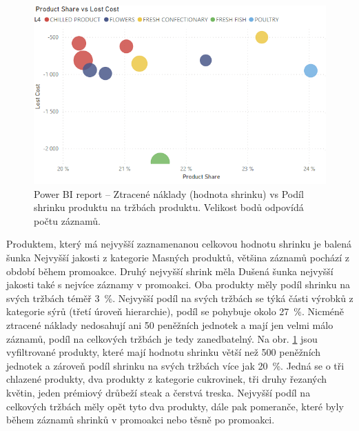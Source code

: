 \begin{figure}[h!]
    \centering
    \captionsetup{justification=centering}
    \includegraphics[width=.8\textwidth]{obrazky/PBI/l3pprductshare.png}
    \caption{Power BI report -- Ztracené náklady (hodnota shrinku) vs Podíl shrinku produktu na tržbách produktu. Velikost bodů odpovídá počtu záznamů.}
    \label{obr:PBI:l3prod}
\end{figure}

Produktem, který má nejvyšší zaznamenanou celkovou hodnotu shrinku je balená šunka Nejvyšší jakosti z kategorie Masných produktů, většina záznamů pochází z období během promoakce. Druhý nejvyšší shrink měla Dušená šunka nejvyšší jakosti také s nejvíce záznamy v promoakci. Oba produkty měly podíl shrinku na svých tržbách téměř 3~\%.  
Nejvyšší podíl na svých tržbách se týká části výrobků z kategorie sýrů (třetí úroveň hierarchie), podíl se pohybuje okolo 27~\%. Nicméně ztracené náklady nedosahují ani 50 peněžních jednotek a mají jen velmi málo záznamů, podíl na celkových tržbách je tedy zanedbatelný.
Na obr. \ref*{obr:PBI:l3prod} jsou vyfiltrované produkty, které mají hodnotu shrinku větší než 500 peněžních jednotek a zároveň podíl shrinku na svých tržbách více jak 20~\%. Jedná se o tři chlazené produkty, dva produkty z kategorie cukrovinek, tři druhy řezaných květin, jeden prémiový drůbeží steak a čerstvá treska. 
Nejvyšší podíl na celkových tržbách měly opět tyto dva produkty, dále pak pomeranče, které byly během záznamů shrinků v promoakci nebo těsně po promoakci.